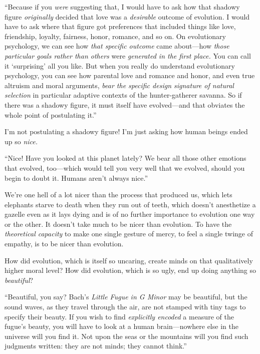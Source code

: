 {
 ``Because if you \textit{were} suggesting that, I
would have to ask how that shadowy figure \textit{originally} decided
that love was a \textit{desirable} outcome of evolution. I would have
to ask where that figure got preferences that included things like
love, friendship, loyalty, fairness, honor, romance, and so on. On
evolutionary psychology, we can see how \textit{that specific outcome}
came about---how \textit{those particular goals rather than others}
were \textit{generated in the first place.} You can call it
`surprising' all you like. But when you
really do understand evolutionary psychology, you can see how parental
love and romance and honor, and even true altruism and moral arguments,
\textit{bear the specific design signature of natural selection} in
particular adaptive contexts of the hunter-gatherer savanna. So if
there was a shadowy figure, it must itself have evolved---and that
obviates the whole point of postulating it.''}

{
 I'm not postulating a shadowy figure!
I'm just asking how human beings ended up so
\textit{nice.}}

{
 ``Nice! Have you looked at this planet lately? We
bear all those other emotions that evolved, too---which would tell you
very well that we evolved, should you begin to doubt it. Humans
aren't always nice.''}

{
 We're one hell of a lot nicer than the process
that produced us, which lets elephants starve to death when they run
out of teeth, which doesn't anesthetize a gazelle even
as it lays dying and is of no further importance to evolution one way
or the other. It doesn't take much to be nicer than
evolution. To have the \textit{theoretical capacity} to make one single
gesture of mercy, to feel a single twinge of empathy, is to be nicer
than evolution.}

{
 How did evolution, which is itself so uncaring, create minds on
that qualitatively higher moral level? How did evolution, which is so
ugly, end up doing anything so \textit{beautiful}?}

{
 ``Beautiful, you say? Bach's
\textit{Little Fugue in G Minor} may be beautiful, but the sound waves,
as they travel through the air, are not stamped with tiny tags to
specify their beauty. If you wish to find \textit{explicitly encoded} a
measure of the fugue's beauty, you will have to look at
a human brain---nowhere else in the universe will you find it. Not upon
the seas or the mountains will you find such judgments written: they
are not minds; they cannot think.''}

